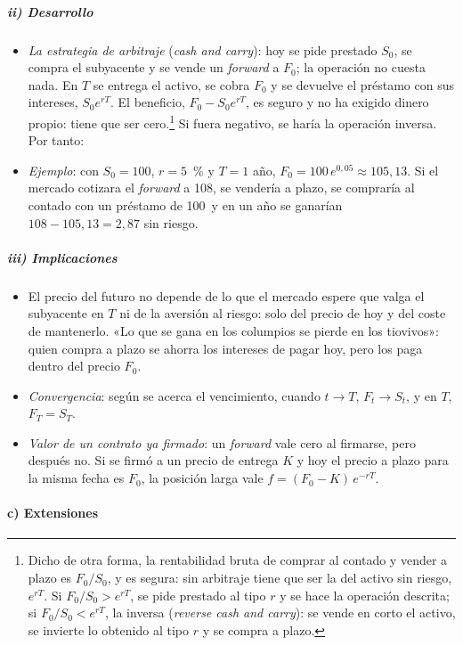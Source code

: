 \documentclass[11pt]{article}
\begin{document}
\subparagraph{ii) Desarrollo}

\begin{itemize}
\item \emph{La estrategia de arbitraje} (\emph{cash and carry}): hoy se pide prestado $S_0$, se compra el subyacente y se vende un \emph{forward} a $F_0$; la operación no cuesta nada. En $T$ se entrega el activo, se cobra $F_0$ y se devuelve el préstamo con sus intereses, $S_0e^{rT}$. El beneficio, $F_0-S_0e^{rT}$, es seguro y no ha exigido dinero propio: tiene que ser cero.\footnote{Dicho de otra forma, la rentabilidad bruta de comprar al contado y vender a plazo es $F_0/S_0$, y es segura: sin arbitraje tiene que ser la del activo sin riesgo, $e^{rT}$. Si $F_0/S_0>e^{rT}$, se pide prestado al tipo $r$ y se hace la operación descrita; si $F_0/S_0<e^{rT}$, la inversa (\emph{reverse cash and carry}): se vende en corto el activo, se invierte lo obtenido al tipo $r$ y se compra a plazo.} Si fuera negativo, se haría la operación inversa. Por tanto:
\item \emph{Ejemplo}: con $S_0=100$, $r=5$~\% y $T=1$ año, $F_0=100\,e^{0{,}05}\approx105{,}13$. Si el mercado cotizara el \emph{forward} a 108, se vendería a plazo, se compraría al contado con un préstamo de 100~y en un año se ganarían $108-105{,}13=2{,}87$ sin riesgo.
\end{itemize}

\subparagraph{iii) Implicaciones}

\begin{itemize}
\item El precio del futuro no depende de lo que el mercado espere que valga el subyacente en $T$ ni de la aversión al riesgo: solo del precio de hoy y del coste de mantenerlo. «Lo que se gana en los columpios se pierde en los tiovivos»: quien compra a plazo se ahorra los intereses de pagar hoy, pero los paga dentro del precio $F_0$.
\item \emph{Convergencia}: según se acerca el vencimiento, cuando $t\to T$, $F_t\to S_t$, y en $T$, $F_T=S_T$.
\item \emph{Valor de un contrato ya firmado}: un \emph{forward} vale cero al firmarse, pero después no. Si se firmó a un precio de entrega $K$ y hoy el precio a plazo para la misma fecha es $F_0$, la posición larga vale $f=(F_0-K)\,e^{-rT}$.
\end{itemize}

\paragraph{c) Extensiones}
\end{document}
